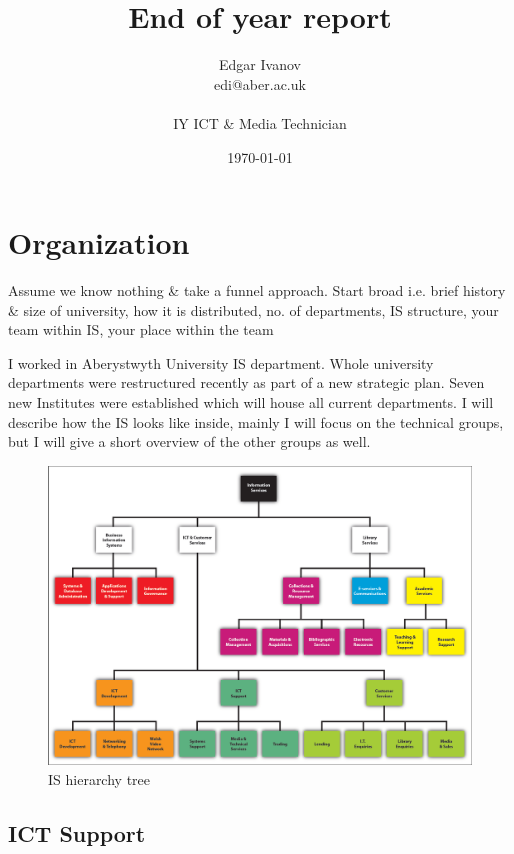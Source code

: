 \documentclass[10pt,a4paper,headinclude=true]{report}
\begin{document}
\title{End of year report}
\author{Edgar Ivanov\\ edi@aber.ac.uk \\ \\ IY ICT \& Media Technician}
\date{\today}
\maketitle

\tableofcontents

\chapter{Organization}
Assume we know nothing \& take a funnel approach. Start broad i.e. brief history \&
size of university, how it is distributed, no. of departments, IS structure, your
team within IS, your place within the team

I worked in Aberystwyth University IS department. Whole university departments were restructured recently as part of a new strategic plan. Seven new Institutes were established which will house all current departments.
I will describe how the IS looks like inside, mainly I will focus on the technical groups, but I will give a short overview of the other groups as well.

\begin{figure}[htbp]
\centering
\centerline{\includegraphics[scale=0.5]{./i-s-hierarchy-tree-march-2012}}
\caption{IS hierarchy tree}
\label{fig:i-s-hierarchy-tree-march-2012}
\end{figure}


\section{ICT Support}
\end{document}

